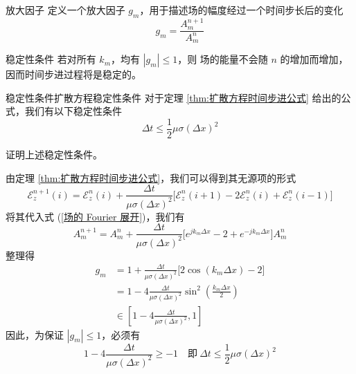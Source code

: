 \begin{definition}{放大因子}
    定义一个放大因子 $g_m$，用于描述场的幅度经过一个时间步长后的变化
    \begin{equation}
        g_m = \frac{A^{n+1}_m}{A^n_m}
    \end{equation}
\end{definition}

\begin{theorem}{稳定性条件}
    若对所有 $k_m$，均有 $|g_m| \leq 1$，则
    场的能量不会随 $n$ 的增加而增加，因而时间步进过程将是稳定的。
\end{theorem}

\begin{theorem}{稳定性条件}{扩散方程稳定性条件}
    对于定理 \ref{thm:扩散方程时间步进公式} 给出的公式，我们有以下稳定性条件
    \begin{equation}
        \Delta t \leq \frac{1}{2} \mu \sigma (\Delta x)^2
    \end{equation}
\end{theorem}

\begin{exercise}
    证明上述稳定性条件。
\end{exercise}

\begin{solution}
    由定理 \ref{thm:扩散方程时间步进公式}，我们可以得到其无源项的形式
    \begin{equation*}
        \mathscr{E}_z^{n+1}(i)=\mathscr{E}_z^n(i)
        +\frac{\Delta t}{\mu \sigma (\Delta x)^2}
        \Big[\mathscr{E}_z^n(i+1)-2\mathscr{E}_z^n(i)+\mathscr{E}_z^n(i-1)\Big]
    \end{equation*}
    将其代入式 (\ref{场的 Fourier 展开})，我们有
    \begin{equation*}
        A_m^{n+1}=A_m^n
        +\frac{\Delta t}{\mu \sigma (\Delta x)^2}
        \Big[e^{jk_m \Delta x}-2+e^{-jk_m \Delta x}\Big]A_m^n
    \end{equation*}
    整理得
    \begin{align*}
        g_m&=1
        +\frac{\Delta t}{\mu \sigma (\Delta x)^2}
        \Big[2\cos (k_m \Delta x)-2\Big]\\
        &=1-4\frac{\Delta t}{\mu \sigma (\Delta x)^2}
        \sin^2\left(\frac{k_m \Delta x}{2}\right)\\
        &\in \left[1 - 4\frac{\Delta t}{\mu \sigma (\Delta x)^2}, 1\right]
    \end{align*}
    因此，为保证 $|g_m|\leq 1$，必须有
    \begin{equation*}
        1 - 4\frac{\Delta t}{\mu \sigma (\Delta x)^2} \geq -1
        \quad \text{即} \ 
        \Delta t \leq \frac{1}{2} \mu \sigma (\Delta x)^2
    \end{equation*}
\end{solution}

